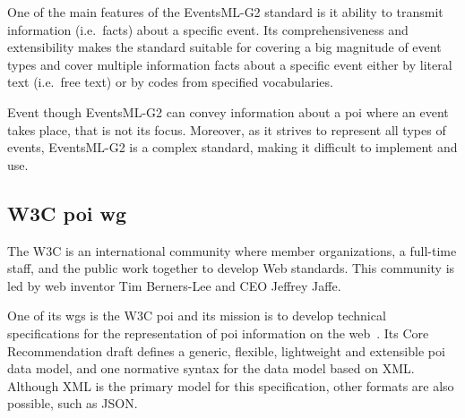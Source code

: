 \documentclass[times,doublespace]{ettauth}%
\begin{document}
One of the main features of the EventsML-G2 standard is it ability to transmit information (i.e.\ facts) about a specific event.
Its comprehensiveness and extensibility makes the standard suitable for covering a big magnitude of event types and cover multiple information facts about a specific event either by literal text (i.e.\ free text) or by codes from specified vocabularies. 

Event though EventsML-G2 can convey information about a \ac{poi} where an event takes place, that is not its focus.
Moreover, as it strives to represent all types of events, EventsML-G2 is a complex standard, making it difficult to implement and use.

\subsection{\acs{W3C} \acl{poi} \acs{wg}}
\label{section:poi-wg}
The \ac{W3C} is an international community where member organizations, a full-time staff, and the public work together to develop Web standards. 
This community is led by web inventor Tim Berners-Lee and CEO Jeffrey Jaffe. 

One of its \acp{wg} is the \ac{W3C} \ac{poi} and its mission is to develop technical specifications for the representation of \ac{poi} information on the web~\cite{w3c-poi}. 
Its Core Recommendation draft defines a generic, flexible, lightweight and extensible \ac{poi} data model, and one normative syntax for the data model based on \acf{XML}.
Although \ac{XML} is the primary model for this specification, other formats are also possible, such as \acf{JSON}.
\end{document}
